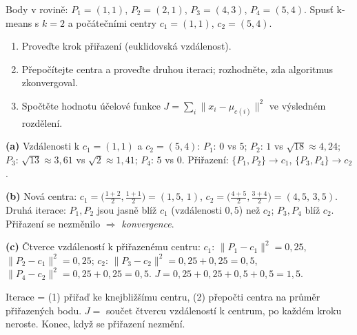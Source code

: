 \begin{zadani}
Body v rovině: $P_1=(1,1)$, $P_2=(2,1)$, $P_3=(4,3)$, $P_4=(5,4)$. Spusť k-means s $k=2$ a počátečními centry $c_1=(1,1)$, $c_2=(5,4)$.
\begin{enumerate}[label=(\alph*)]
  \item {} Proveďte krok přiřazení (euklidovská vzdálenost).
  \item {} Přepočítejte centra a proveďte druhou iteraci; rozhodněte, zda algoritmus zkonvergoval.
  \item {} Spočtěte hodnotu účelové funkce $J=\sum_i\lVert x_i-\mu_{c(i)}\rVert^2$ ve výsledném rozdělení.
\end{enumerate}
\end{zadani}

\begin{reseni}
\textbf{(a)} Vzdálenosti k $c_1=(1,1)$ a $c_2=(5,4)$:
$P_1$: $0$ vs $5$; $P_2$: $1$ vs $\sqrt{18}\approx4{,}24$; $P_3$: $\sqrt{13}\approx3{,}61$ vs $\sqrt2\approx1{,}41$; $P_4$: $5$ vs $0$.
Přiřazení: $\{P_1,P_2\}\to c_1$, $\{P_3,P_4\}\to c_2$.

\textbf{(b)} Nová centra: $c_1=\big(\tfrac{1+2}{2},\tfrac{1+1}{2}\big)=(1{,}5,\,1)$, $c_2=\big(\tfrac{4+5}{2},\tfrac{3+4}{2}\big)=(4{,}5,\,3{,}5)$. Druhá iterace: $P_1,P_2$ jsou jasně blíž $c_1$ (vzdálenosti $0{,}5$) než $c_2$; $P_3,P_4$ blíž $c_2$. Přiřazení se nezměnilo $\Rightarrow$ \emph{konvergence}.

\textbf{(c)} Čtverce vzdáleností k přiřazenému centru:
$c_1$: $\lVert P_1-c_1\rVert^2=0{,}25$, $\lVert P_2-c_1\rVert^2=0{,}25$;
$c_2$: $\lVert P_3-c_2\rVert^2=0{,}25+0{,}25=0{,}5$, $\lVert P_4-c_2\rVert^2=0{,}25+0{,}25=0{,}5$.
$J=0{,}25+0{,}25+0{,}5+0{,}5=1{,}5$.
\end{reseni}

\begin{jadro}
Iterace = (1) přiřaď ke knejbližšímu centru, (2) přepočti centra na průměr přiřazených bodu. $J=$ součet čtvercu vzdáleností k centrum, po každém kroku neroste. Konec, když se přiřazení nezmění.
\end{jadro}


